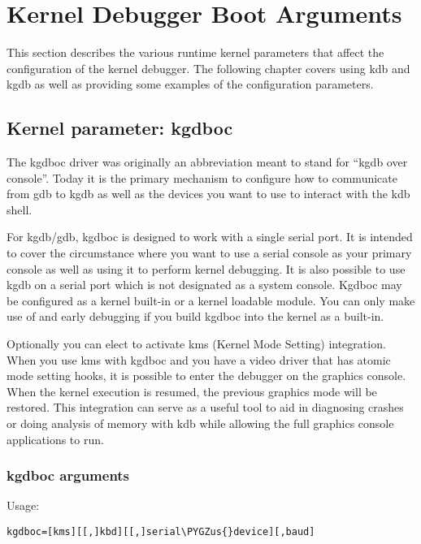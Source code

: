 \documentclass[a4paper,8pt,english]{sphinxmanual}
\def\PYGZus{\char`\_}
\begin{document}
\section{Kernel Debugger Boot Arguments}
\label{dev-tools/kgdb:kernel-debugger-boot-arguments}
This section describes the various runtime kernel parameters that affect
the configuration of the kernel debugger. The following chapter covers
using kdb and kgdb as well as providing some examples of the
configuration parameters.


\subsection{Kernel parameter: kgdboc}
\label{dev-tools/kgdb:kernel-parameter-kgdboc}
The kgdboc driver was originally an abbreviation meant to stand for
``kgdb over console''. Today it is the primary mechanism to configure how
to communicate from gdb to kgdb as well as the devices you want to use
to interact with the kdb shell.

For kgdb/gdb, kgdboc is designed to work with a single serial port. It
is intended to cover the circumstance where you want to use a serial
console as your primary console as well as using it to perform kernel
debugging. It is also possible to use kgdb on a serial port which is not
designated as a system console. Kgdboc may be configured as a kernel
built-in or a kernel loadable module. You can only make use of
 and early debugging if you build kgdboc into the kernel as
a built-in.

Optionally you can elect to activate kms (Kernel Mode Setting)
integration. When you use kms with kgdboc and you have a video driver
that has atomic mode setting hooks, it is possible to enter the debugger
on the graphics console. When the kernel execution is resumed, the
previous graphics mode will be restored. This integration can serve as a
useful tool to aid in diagnosing crashes or doing analysis of memory
with kdb while allowing the full graphics console applications to run.


\subsubsection{kgdboc arguments}
\label{dev-tools/kgdb:kgdboc-arguments}
Usage:

\begin{Verbatim}[commandchars=\\\{\}]
kgdboc=[kms][[,]kbd][[,]serial\PYGZus{}device][,baud]
\end{Verbatim}
\end{document}
